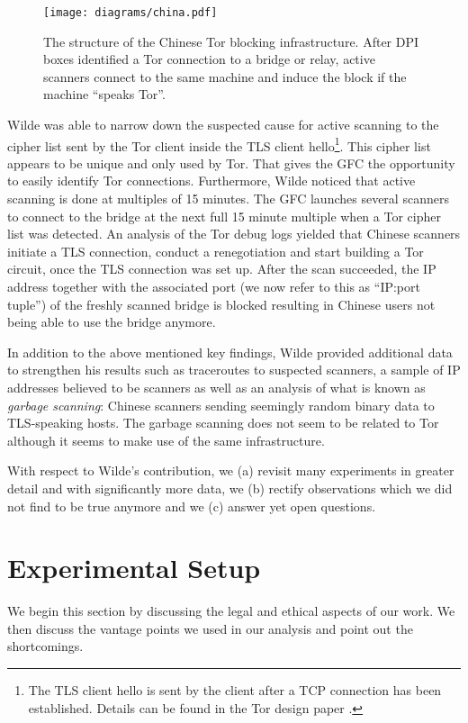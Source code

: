\documentclass[runningheads,a4paper]{llncs}
\begin{document}
\begin{figure}
\centering
\texttt{[image: diagrams/china.pdf]}
\caption{The structure of the Chinese Tor blocking infrastructure. After DPI boxes identified a Tor
connection to a bridge or relay, active scanners connect to the same machine and induce the block if
the machine ``speaks Tor''.}
\label{fig:china}
\end{figure}

Wilde was able to narrow down the suspected cause for active scanning to the cipher list sent by the
Tor client inside the TLS client hello\footnote{The TLS client hello is sent by the client after a
TCP connection has been established. Details can be found in the Tor design paper
\cite{Dingledine2004}.}. This cipher list appears to be unique and only used by Tor. That gives the
GFC the opportunity to easily identify Tor connections. Furthermore, Wilde noticed that active
scanning is done at multiples of 15 minutes. The GFC launches several scanners to connect to the
bridge at the next full 15 minute multiple when a Tor cipher list was detected. An analysis of the
Tor debug logs yielded that Chinese scanners initiate a TLS connection, conduct a renegotiation and
start building a Tor circuit, once the TLS connection was set up. After the scan succeeded, the IP
address together with the associated port (we now refer to this as ``IP:port tuple'') of the freshly
scanned bridge is blocked resulting in Chinese users not being able to use the bridge anymore.

In addition to the above mentioned key findings, Wilde provided additional data to strengthen his
results such as traceroutes to suspected scanners, a sample of IP addresses believed to be scanners
as well as an analysis of what is known as \emph{garbage scanning}: Chinese scanners sending
seemingly random binary data to TLS-speaking hosts. The garbage scanning does not seem to be related
to Tor although it seems to make use of the same infrastructure.

With respect to Wilde's contribution, we (a) revisit many experiments in greater detail and with
significantly more data, we (b) rectify observations which we did not find to be true anymore and we
(c) answer yet open questions.


\section{Experimental Setup}
\label{sec:setup}
We begin this section by discussing the legal and ethical aspects of our work. We then discuss the
vantage points we used in our analysis and point out the shortcomings.
\end{document}
